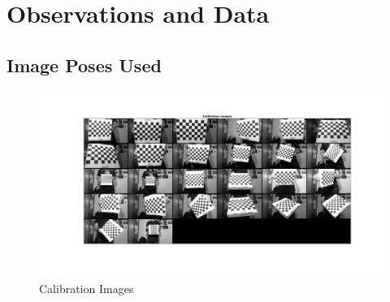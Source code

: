 \documentclass[10pt,a4paper]{article}
\begin{document}
	\section{Observations and Data}
		\subsection{Image Poses Used}
			\begin{figure}[h]
				\centering
				\includegraphics[scale=0.2]{images/calibimages.jpg}
				\caption{Calibration Images}
			\end{figure}
\end{document}
